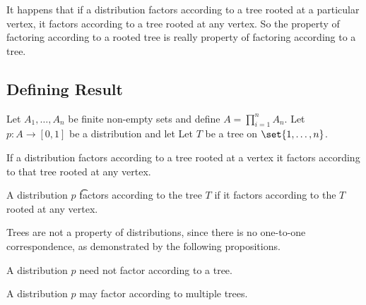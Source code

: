 

It happens that if a distribution factors according to a tree rooted at a particular vertex, it factors according to a tree rooted at any vertex.
So the property of factoring according to a rooted tree is really property of factoring according to a tree.


\subsection{Defining Result}

\begin{prop}
Let $A_1, \dots, A_n$ be finite non-empty sets and define $A = \prod_{i = 1}^{n} A_n$.
Let $p: A \to [0, 1]$ be a distribution and let
Let $T$ be a tree on $\set{1, \dots, n}$.
\end{prop}

\begin{prop}
If a distribution factors according to a tree rooted at a vertex it factors according to that tree rooted at any vertex.
\end{prop}


A distribution $p$
\t{factors according to the tree}{} $T$
if it factors according to the
$T$ rooted at any vertex.


Trees are not a property of distributions,
since there is no one-to-one correspondence,
as demonstrated by the following propositions.


A distribution $p$ need not factor according to a tree.

A distribution
$p$ may factor according to multiple trees.

